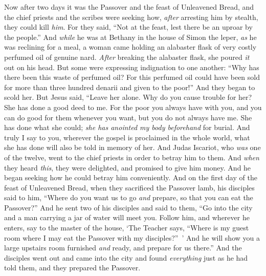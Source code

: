 \begin{biblechapter} %
 Now after two days it was the Passover and the feast of Unleavened Bread, and the chief priests and the scribes were seeking how, \textit{after} arresting him by stealth, they could kill \textit{him}.
\verse For they said, “Not at the feast, lest there be an uproar by the people.”
 And \textit{while} he was at Bethany in the house of Simon the leper, \textit{as} he was reclining for a meal, a woman came holding an alabaster flask of very costly perfumed oil of genuine nard. \textit{After} breaking the alabaster flask, she poured \textit{it} out on his head.
\verse But some were expressing indignation to one another: “Why has there been this waste of perfumed oil?
\verse For this perfumed oil could have been sold for more than three hundred denarii and given to the poor!” And they began to scold her.
\verse But Jesus said, “Leave her alone. Why do you cause trouble for her? She has done a good deed to me.
\verse For the poor you always have with you, and you can do good for them whenever you want, but you do not always have me.
\verse She has done what she could; \textit{she has anointed my body beforehand} for burial.
\verse And truly I say to you, wherever the gospel is proclaimed in the whole world, what she has done will also be told in memory of her.
 And Judas Iscariot, who \textit{was} one of the twelve, went to the chief priests in order to betray him to them.
\verse And \textit{when} they heard \textit{this}, they were delighted, and promised to give him money. And he began seeking how he could betray him conveniently.
 And on the first day of the feast of Unleavened Bread, when they sacrificed the Passover lamb, his disciples said to him, “Where do you want us to go \textit{and} prepare, so that you can eat the Passover?”
\verse And he sent two of his disciples and said to them, “Go into the city and a man carrying a jar of water will meet you. Follow him,
\verse and wherever he enters, say to the master of the house, ‘The Teacher says, “Where is my guest room where I may eat the Passover with my disciples?” ’
\verse And he will show you a large upstairs room furnished \textit{and} ready, and prepare for us there.”
\verse And the disciples went out and came into the city and found \textit{everything} just as he had told them, and they prepared the Passover.

\end{biblechapter}
